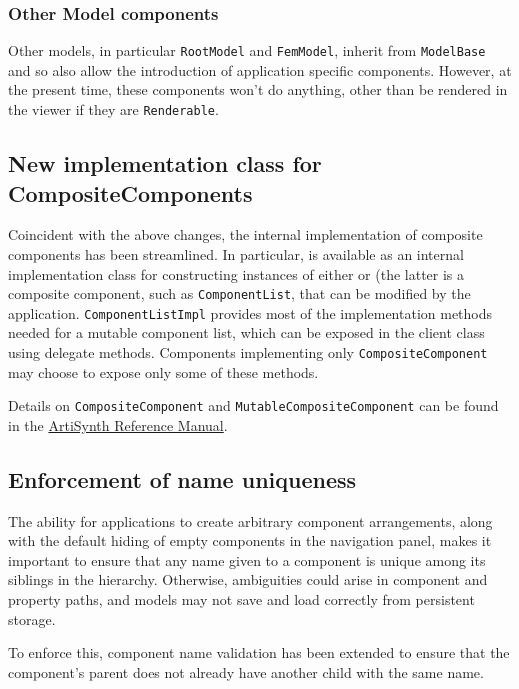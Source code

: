 \documentclass{article}
\begin{document}
\subsubsection*{Other Model components}

Other models, in particular {\tt RootModel} and {\tt FemModel},
inherit from {\tt ModelBase} and so also allow the introduction of
application specific components. However, at the present time, these
components won't do anything, other than be rendered in the viewer if
they are {\tt Renderable}.

\subsection*{New implementation class for CompositeComponents}


Coincident with the above changes, the internal implementation of
composite components has been streamlined. In particular,
 is available as an internal
implementation class for constructing instances of either
 or
 (the latter is a composite
component, such as {\tt ComponentList}, that can be modified by the
application.  {\tt ComponentListImpl} provides most of the
implementation methods needed for a mutable component list, which can
be exposed in the client class using delegate methods.  Components
implementing only {\tt CompositeComponent} may choose to expose only
some of these methods.

Details on {\tt CompositeComponent} and {\tt MutableCompositeComponent}
can be found in the 
\href{http://www.artisynth.org/doc/html/artisynth/artisynth.html}%
{ArtiSynth Reference Manual}.

\subsection*{Enforcement of name uniqueness}

The ability for applications to create arbitrary component
arrangements, along with the default hiding of empty components in the
navigation panel, makes it important to ensure that any name given to
a component is unique among its siblings in the hierarchy.  Otherwise,
ambiguities could arise in component and property paths, and models
may not save and load correctly from persistent storage.

To enforce this, component name validation has been extended to ensure
that the component's parent does not already have another child with
the same name.
\end{document}
